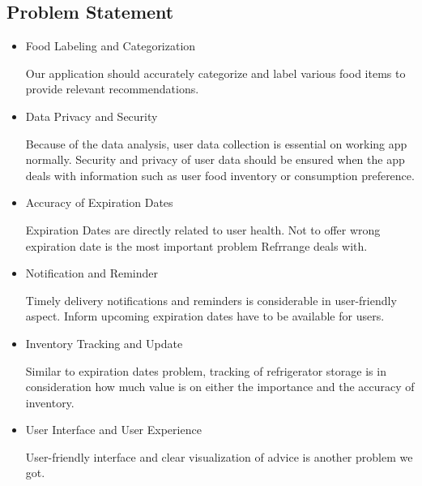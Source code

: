 \documentclass[conference]{IEEEtran}
\begin{document}
\subsection{Problem Statement}
\begin{itemize}
    \item Food Labeling and Categorization\par
    Our application should accurately categorize and label various food items to provide relevant recommendations. 
    \item Data Privacy and Security\par
    Because of the data analysis, user data collection is essential on working app normally. Security and privacy of user data should be ensured when the app deals with information such as user food inventory or consumption preference.
    \item Accuracy of Expiration Dates\par
    Expiration Dates are directly related to user health. Not to offer wrong expiration date is the most important problem Refrrange deals with.
    \item Notification and Reminder\par
    Timely delivery notifications and reminders is considerable in user-friendly aspect. Inform upcoming expiration dates have to be available for users.
    \item Inventory Tracking and Update\par
    Similar to expiration dates problem, tracking of refrigerator storage is in consideration how much value is on either the importance and the accuracy of inventory.
    \item User Interface and User Experience\par
    User-friendly interface and clear visualization of advice is another problem we got.
\end{itemize}
\end{document}
